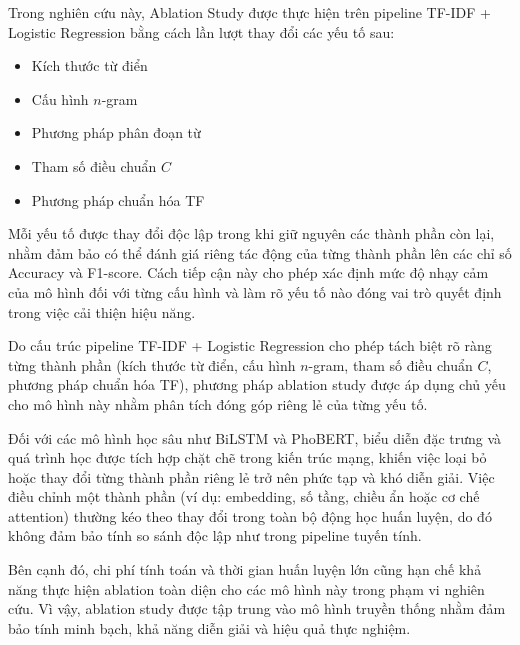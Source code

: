 \documentclass[12pt, a4paper]{report}
\begin{document}
Trong nghiên cứu này, Ablation Study được thực hiện trên pipeline 
TF-IDF + Logistic Regression bằng cách lần lượt thay đổi các yếu tố sau:

\begin{itemize}
    \item Kích thước từ điển
    \item Cấu hình $n$-gram
    \item Phương pháp phân đoạn từ
    \item Tham số điều chuẩn $C$
    \item Phương pháp chuẩn hóa TF
\end{itemize}

Mỗi yếu tố được thay đổi độc lập trong khi giữ nguyên các thành phần còn lại, 
nhằm đảm bảo có thể đánh giá riêng tác động của từng thành phần 
lên các chỉ số Accuracy và F1-score. 
Cách tiếp cận này cho phép xác định mức độ nhạy cảm của mô hình 
đối với từng cấu hình và làm rõ yếu tố nào đóng vai trò quyết định 
trong việc cải thiện hiệu năng.

Do cấu trúc pipeline TF-IDF + Logistic Regression cho phép 
tách biệt rõ ràng từng thành phần (kích thước từ điển, cấu hình $n$-gram, 
tham số điều chuẩn $C$, phương pháp chuẩn hóa TF), phương pháp 
ablation study được áp dụng chủ yếu cho mô hình này nhằm phân tích 
đóng góp riêng lẻ của từng yếu tố.

Đối với các mô hình học sâu như BiLSTM và PhoBERT, biểu diễn đặc trưng 
và quá trình học được tích hợp chặt chẽ trong kiến trúc mạng, 
khiến việc loại bỏ hoặc thay đổi từng thành phần riêng lẻ 
trở nên phức tạp và khó diễn giải. 
Việc điều chỉnh một thành phần (ví dụ: embedding, số tầng, 
chiều ẩn hoặc cơ chế attention) thường kéo theo thay đổi 
trong toàn bộ động học huấn luyện, do đó không đảm bảo tính 
so sánh độc lập như trong pipeline tuyến tính.

Bên cạnh đó, chi phí tính toán và thời gian huấn luyện lớn 
cũng hạn chế khả năng thực hiện ablation toàn diện cho các mô hình này 
trong phạm vi nghiên cứu. 
Vì vậy, ablation study được tập trung vào mô hình truyền thống 
nhằm đảm bảo tính minh bạch, khả năng diễn giải và hiệu quả thực nghiệm.
\end{document}
